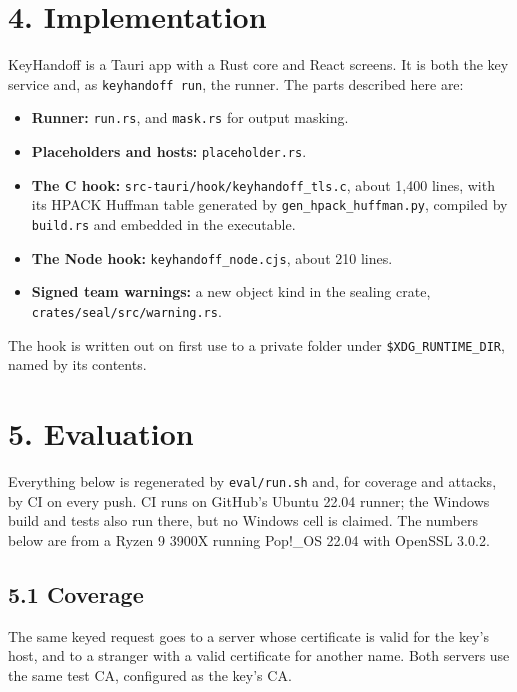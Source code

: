 \documentclass[
  11pt]{article}
\providecommand{\tightlist}{%
  \setlength{\itemsep}{0pt}\setlength{\parskip}{0pt}}
\begin{document}
\section*{4.
Implementation}\label{implementation}

KeyHandoff is a Tauri app with a Rust
core and React screens. It is both the
key service and, as
\texttt{keyhandoff\ run}, the runner.
The parts described here are:

\begin{itemize}
\tightlist
\item
  \textbf{Runner:} \texttt{run.rs}, and
  \texttt{mask.rs} for output masking.
\item
  \textbf{Placeholders and hosts:}
  \texttt{placeholder.rs}.
\item
  \textbf{The C hook:}
  \texttt{src-tauri/hook/keyhandoff\_tls.c},
  about 1,400 lines, with its HPACK
  Huffman table generated by
  \texttt{gen\_hpack\_huffman.py},
  compiled by \texttt{build.rs} and
  embedded in the executable.
\item
  \textbf{The Node hook:}
  \texttt{keyhandoff\_node.cjs}, about
  210 lines.
\item
  \textbf{Signed team warnings:} a new
  object kind in the sealing crate,
  \texttt{crates/seal/src/warning.rs}.
\end{itemize}

The hook is written out on first use to
a private folder under
\texttt{\$XDG\_RUNTIME\_DIR}, named by
its contents.

\section*{5.
Evaluation}\label{evaluation}

Everything below is regenerated by
\texttt{eval/run.sh} and, for coverage
and attacks, by CI on every push. CI
runs on GitHub's Ubuntu 22.04 runner;
the Windows build and tests also run
there, but no Windows cell is claimed.
The numbers below are from a Ryzen 9
3900X running Pop!\_OS 22.04 with
OpenSSL 3.0.2.

\subsection*{5.1
Coverage}\label{coverage}

The same keyed request goes to a server
whose certificate is valid for the key's
host, and to a stranger with a valid
certificate for another name. Both
servers use the same test CA, configured
as the key's CA.
\end{document}
